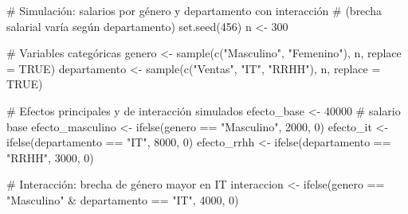\documentclass[
  letterpaper,
  DIV=11,
  numbers=noendperiod]{scrreprt}
\newenvironment{Shaded}{\begin{snugshade}}{\end{snugshade}}
\newcommand{\AttributeTok}[1]{\textcolor[rgb]{0.40,0.45,0.13}{#1}}
\newcommand{\CommentTok}[1]{\textcolor[rgb]{0.37,0.37,0.37}{#1}}
\newcommand{\ConstantTok}[1]{\textcolor[rgb]{0.56,0.35,0.01}{#1}}
\newcommand{\DecValTok}[1]{\textcolor[rgb]{0.68,0.00,0.00}{#1}}
\newcommand{\FunctionTok}[1]{\textcolor[rgb]{0.28,0.35,0.67}{#1}}
\newcommand{\NormalTok}[1]{\textcolor[rgb]{0.00,0.23,0.31}{#1}}
\newcommand{\OtherTok}[1]{\textcolor[rgb]{0.00,0.23,0.31}{#1}}
\newcommand{\SpecialCharTok}[1]{\textcolor[rgb]{0.37,0.37,0.37}{#1}}
\newcommand{\StringTok}[1]{\textcolor[rgb]{0.13,0.47,0.30}{#1}}
\begin{document}
\begin{tcolorbox}[enhanced jigsaw, breakable, toprule=.15mm, bottomtitle=1mm, coltitle=black, colbacktitle=quarto-callout-tip-color!10!white, titlerule=0mm, opacitybacktitle=0.6, bottomrule=.15mm, toptitle=1mm, title=\textcolor{quarto-callout-tip-color}{\faLightbulb}\hspace{0.5em}{Ejemplo: Interacción género-departamento en salarios}, arc=.35mm, rightrule=.15mm, opacityback=0, colframe=quarto-callout-tip-color-frame, leftrule=.75mm, left=2mm, colback=white]

\begin{Shaded}
\begin{Highlighting}[]
\CommentTok{\# Simulación: salarios por género y departamento con interacción}
\CommentTok{\# (brecha salarial varía según departamento)}
\FunctionTok{set.seed}\NormalTok{(}\DecValTok{456}\NormalTok{)}
\NormalTok{n }\OtherTok{\textless{}{-}} \DecValTok{300}

\CommentTok{\# Variables categóricas}
\NormalTok{genero }\OtherTok{\textless{}{-}} \FunctionTok{sample}\NormalTok{(}\FunctionTok{c}\NormalTok{(}\StringTok{"Masculino"}\NormalTok{, }\StringTok{"Femenino"}\NormalTok{), n, }\AttributeTok{replace =} \ConstantTok{TRUE}\NormalTok{)}
\NormalTok{departamento }\OtherTok{\textless{}{-}} \FunctionTok{sample}\NormalTok{(}\FunctionTok{c}\NormalTok{(}\StringTok{"Ventas"}\NormalTok{, }\StringTok{"IT"}\NormalTok{, }\StringTok{"RRHH"}\NormalTok{), n, }\AttributeTok{replace =} \ConstantTok{TRUE}\NormalTok{)}

\CommentTok{\# Efectos principales y de interacción simulados}
\NormalTok{efecto\_base }\OtherTok{\textless{}{-}} \DecValTok{40000}  \CommentTok{\# salario base}
\NormalTok{efecto\_masculino }\OtherTok{\textless{}{-}} \FunctionTok{ifelse}\NormalTok{(genero }\SpecialCharTok{==} \StringTok{"Masculino"}\NormalTok{, }\DecValTok{2000}\NormalTok{, }\DecValTok{0}\NormalTok{)}
\NormalTok{efecto\_it }\OtherTok{\textless{}{-}} \FunctionTok{ifelse}\NormalTok{(departamento }\SpecialCharTok{==} \StringTok{"IT"}\NormalTok{, }\DecValTok{8000}\NormalTok{, }\DecValTok{0}\NormalTok{)}
\NormalTok{efecto\_rrhh }\OtherTok{\textless{}{-}} \FunctionTok{ifelse}\NormalTok{(departamento }\SpecialCharTok{==} \StringTok{"RRHH"}\NormalTok{, }\DecValTok{3000}\NormalTok{, }\DecValTok{0}\NormalTok{)}

\CommentTok{\# Interacción: brecha de género mayor en IT}
\NormalTok{interaccion }\OtherTok{\textless{}{-}} \FunctionTok{ifelse}\NormalTok{(genero }\SpecialCharTok{==} \StringTok{"Masculino"} \SpecialCharTok{\&}\NormalTok{ departamento }\SpecialCharTok{==} \StringTok{"IT"}\NormalTok{, }\DecValTok{4000}\NormalTok{, }\DecValTok{0}\NormalTok{)}


\end{Highlighting}
\end{Shaded}
\end{tcolorbox}
\end{document}

